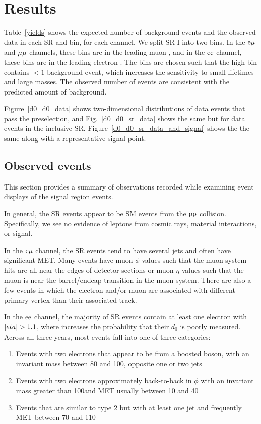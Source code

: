 \section{Results}
\label{results}

Table~\ref{yields} shows the expected number of background events and the observed data in each SR and \pt bin, for each channel. We split SR I into two bins. In the $\mathrm{e}{\mu}$ and ${\mu}{\mu}$ channels, these bins are in the leading muon \pt, and in the $\mathrm{e}\mathrm{e}$ channel, these bins are in the leading electron \pt. The \pt bins are chosen such that the high-\pt bin contains ${<}1$ background event, which increases the sensitivity to small lifetimes and large masses. The observed number of events are consistent with the predicted amount of background.



Figure~\ref{d0_d0_data} shows two-dimensional \ad distributions of data events that pass the preselection, and Fig.~\ref{d0_d0_sr_data} shows the same but for data events in the inclusive SR. Figure~\ref{d0_d0_sr_data_and_signal} shows the the same along with a representative signal point.



\subsection{Observed events}
This section provides a summary of observations recorded while examining event displays of the signal region events.

In general, the SR events appear to be SM events from the $\mathrm{p}\mathrm{p}$ collision. Specifically, we see no evidence of leptons from cosmic rays, material interactions, or signal.

In the $\mathrm{e}{\mu}$ channel, the SR events tend to have several jets and often have significant MET. Many events have muon $\phi$ values such that the muon system hits are all near the edges of detector sections or muon $\eta$ values such that the muon is near the barrel/endcap transition in the muon system. There are also a few events in which the electron and/or muon are associated with different primary vertex than their associated track.

In the $\mathrm{e}\mathrm{e}$ channel, the majority of SR events contain at least one electron with $\lvert eta \rvert > 1.1$, where increases the probability that their $d_0$ is poorly measured. Across all three years, most events fall into one of three categories: 
\begin{enumerate}
    \item Events with two electrons that appear to be from a boosted \PZ boson, with an invariant mass between 80 and 100\GeV, opposite one or two jets
    \item Events with two electrons approximately back-to-back in $\phi$ with an invariant mass greater than 100\GeV and MET usually between 10 and 40\GeV
    \item Events that are similar to type 2 but with at least one jet and frequently MET between 70 and 110\GeV
\end{enumerate}

